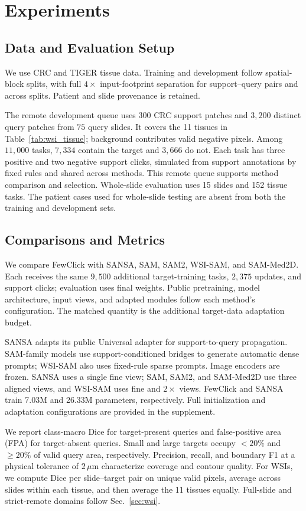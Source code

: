\section{Experiments}
\label{sec:experiments}
\subsection{Data and Evaluation Setup}
We use CRC and TIGER tissue data. Training and development follow spatial-block splits, with full $4\times$ input-footprint separation for support--query pairs and across splits. Patient and slide provenance is retained.

The remote development queue uses $300$ CRC support patches and $3{,}200$ distinct query patches from $75$ query slides. It covers the 11 tissues in Table~\ref{tab:wsi_tissue}; background contributes valid negative pixels. Among $11{,}000$ tasks, $7{,}334$ contain the target and $3{,}666$ do not. Each task has three positive and two negative support clicks, simulated from support annotations by fixed rules and shared across methods. This remote queue supports method comparison and selection. Whole-slide evaluation uses 15 slides and 152 tissue tasks. The patient cases used for whole-slide testing are absent from both the training and development sets.

\subsection{Comparisons and Metrics}
\label{sec:baselines}
We compare FewClick with SANSA, SAM, SAM2, WSI-SAM, and SAM-Med2D. Each receives the same $9{,}500$ additional target-training tasks, $2{,}375$ updates, and support clicks; evaluation uses final weights. Public pretraining, model architecture, input views, and adapted modules follow each method's configuration. The matched quantity is the additional target-data adaptation budget.

SANSA adapts its public Universal adapter for support-to-query propagation. SAM-family models use support-conditioned bridges to generate automatic dense prompts; WSI-SAM also uses fixed-rule sparse prompts. Image encoders are frozen. SANSA uses a single fine view; SAM, SAM2, and SAM-Med2D use three aligned views, and WSI-SAM uses fine and $2\times$ views. FewClick and SANSA train 7.03M and 26.33M parameters, respectively. Full initialization and adaptation configurations are provided in the supplement.

We report class-macro Dice for target-present queries and false-positive area (FPA) for target-absent queries. Small and large targets occupy $<20\%$ and $\geq20\%$ of valid query area, respectively. Precision, recall, and boundary F1 at a physical tolerance of $2\,\mu$m characterize coverage and contour quality. For WSIs, we compute Dice per slide--target pair on unique valid pixels, average across slides within each tissue, and then average the 11 tissues equally. Full-slide and strict-remote domains follow Sec.~\ref{sec:wsi}.

